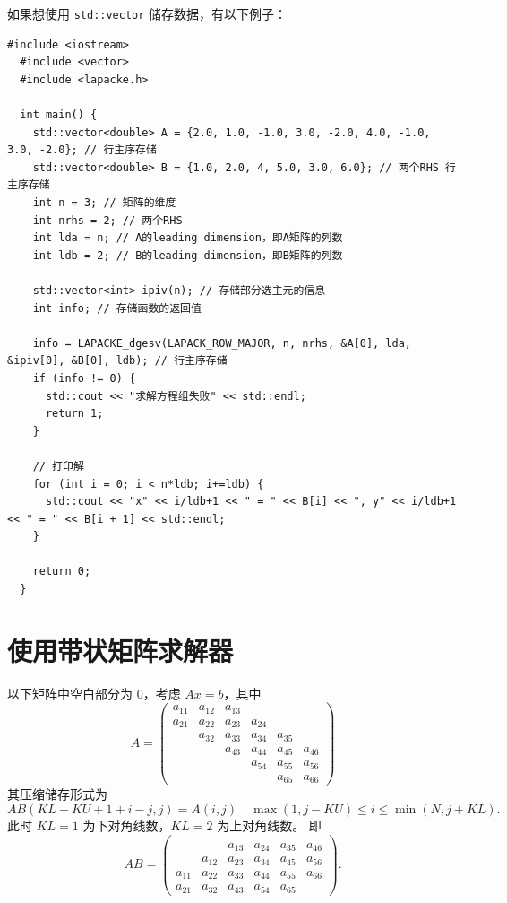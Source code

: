\documentclass[a4paper,7pt,onecolumn,oneside]{article}
\begin{document}
如果想使用 \texttt{std::vector} 储存数据，有以下例子：
\begin{lstlisting}[style=ccstyle]
  #include <iostream>
  #include <vector>
  #include <lapacke.h>

  int main() {
    std::vector<double> A = {2.0, 1.0, -1.0, 3.0, -2.0, 4.0, -1.0, 3.0, -2.0}; // 行主序存储
    std::vector<double> B = {1.0, 2.0, 4, 5.0, 3.0, 6.0}; // 两个RHS 行主序存储
    int n = 3; // 矩阵的维度
    int nrhs = 2; // 两个RHS
    int lda = n; // A的leading dimension，即A矩阵的列数
    int ldb = 2; // B的leading dimension，即B矩阵的列数

    std::vector<int> ipiv(n); // 存储部分选主元的信息
    int info; // 存储函数的返回值

    info = LAPACKE_dgesv(LAPACK_ROW_MAJOR, n, nrhs, &A[0], lda, &ipiv[0], &B[0], ldb); // 行主序存储
    if (info != 0) {
      std::cout << "求解方程组失败" << std::endl;
      return 1;
    }

    // 打印解
    for (int i = 0; i < n*ldb; i+=ldb) {
      std::cout << "x" << i/ldb+1 << " = " << B[i] << ", y" << i/ldb+1 << " = " << B[i + 1] << std::endl;
    }

    return 0;
  }
\end{lstlisting}

\section{使用带状矩阵求解器}
以下矩阵中空白部分为 $0$，考虑 $Ax = b$，其中
\[
  A =
  \begin{pmatrix} 
    a_{11}  & a_{12} & a_{13} &  &  &  \\
    a_{21}  & a_{22} & a_{23} & a_{24} &  &  \\
            & a_{32} & a_{33} & a_{34} & a_{35} &  \\
            &  & a_{43} & a_{44} & a_{45} & a_{46} \\
            &  &  & a_{54} & a_{55} & a_{56} \\
            &  &  &  & a_{65} & a_{66}
  \end{pmatrix}
\]
其压缩储存形式为
\[
  AB(KL + KU + 1 + i - j , j) = A(i, j) \quad \max(1,j-KU) \le i \le \min(N,j+KL).
\]
此时 $KL = 1$ 为下对角线数，$KL = 2$ 为上对角线数。
即
\[
  AB =
  \begin{pmatrix} 
    &  &  &  &  &  \\
    &  & a_{13} & a_{24} & a_{35} & a_{46} \\
    & a_{12} & a_{23} & a_{34} & a_{45} & a_{56} \\
    a_{11}  & a_{22} & a_{33} & a_{44} & a_{55} & a_{66} \\
    a_{21}  & a_{32} & a_{43} & a_{54} & a_{65} & 
  \end{pmatrix}.
\]
\end{document}
